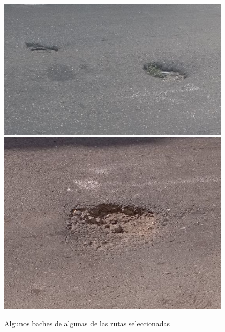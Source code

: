 \begin{appendices}
		\begin{figure}[htb]
			\centering
			\includegraphics[scale = 0.3]{Graphics/pothole_7.jpg}
			\includegraphics[scale = 0.3]{Graphics/pothole_8.jpg}
			\caption{Algunos baches de algunas de las rutas seleccionadas}
			\label{fig:19}
		\end{figure}


\end{appendices}
